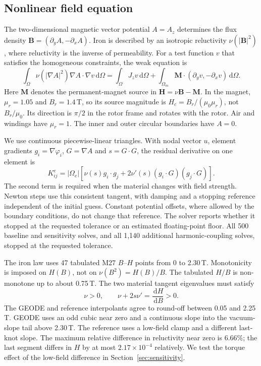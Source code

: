 \documentclass{anvil-paper}
\newcommand{\dd}{\,\mathrm{d}}
\begin{document}
\subsection{Nonlinear field equation}
The two-dimensional magnetic vector potential $A=A_z$ determines the
flux density $\mathbf B=(\partial_y A,-\partial_x A)$. Iron is described
by an isotropic reluctivity $\nu(|\mathbf B|^2)$, where reluctivity is
the inverse of permeability. For a test function $v$ that satisfies the
homogeneous constraints, the weak equation is
\begin{equation}
 \int_\Omega \nu(|\nabla A|^2)\nabla A\cdot\nabla v\dd\Omega
 =\int_\Omega J_z v\dd\Omega
  +\int_{\Omega_m}\mathbf M\cdot(\partial_y v,-\partial_x v)\dd\Omega.
 \label{eq:weak}
\end{equation}
Here $\mathbf M$ denotes the permanent-magnet source in
$\mathbf H=\nu\mathbf B-\mathbf M$. In the magnet,
$\mu_r=1.05$ and $B_r=1.4$\,T, so its source magnitude is
$H_c=B_r/(\mu_0\mu_r)$, not $B_r/\mu_0$. Its direction is $\pi/2$
in the rotor frame and rotates with the rotor. Air and windings have
$\mu_r=1$. The inner and outer circular boundaries have $A=0$.

We use continuous piecewise-linear triangles. With nodal vector $u$,
element gradients $g_i=\nabla\varphi_i$, $G=\nabla A$ and $s=G\cdot G$,
the residual derivative on one element is
\begin{equation}
 K^e_{ij}=|\Omega_e|\left[\nu(s)g_i\cdot g_j
       +2\nu'(s)(g_i\cdot G)(g_j\cdot G)\right].
 \label{eq:tangent}
\end{equation}
The second term is required when the material changes with field strength.
Newton steps use this consistent tangent, with damping and a stopping
reference independent of the initial guess. Constant potential offsets,
where allowed by the boundary conditions, do not change that reference.
The solver reports whether it stopped at the requested tolerance or an
estimated floating-point floor. All 500 baseline and sensitivity solves, and all 1,140
additional harmonic-coupling solves, stopped at the requested tolerance.

The iron law uses 47 tabulated M27 $B$--$H$ points from 0 to 2.30\,T.
Monotonicity is imposed on $H(B)$, not on $\nu(B^2)=H(B)/B$.
The tabulated $H/B$ is non-monotone up to about 0.75\,T.
The two material tangent eigenvalues must satisfy
\begin{equation}
 \nu>0,\qquad \nu+2s\nu'=\frac{\dd H}{\dd B}>0.
\end{equation}
The GEODE and reference interpolants agree to round-off between 0.05 and
2.25\,T. GEODE uses an odd cubic near zero and a continuous slope into the
vacuum-slope tail above 2.30\,T. The reference uses a low-field clamp and
a different last-knot slope. The maximum relative difference in
reluctivity near zero is 6.66\%; the last segment differs in $H$ by at
most $2.17\times10^{-4}$ relatively. We test the torque effect of the
low-field difference in Section~\ref{sec:sensitivity}.
\end{document}
